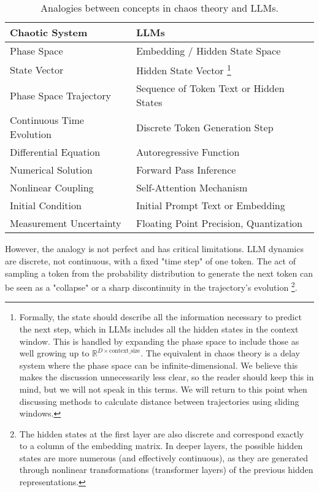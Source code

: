 \documentclass[a4paper,12pt]{article}
\begin{document}
\begin{table}[H]
\centering
\begin{tabular}{@{}ll@{}}
\toprule
\textbf{Chaotic System} & \textbf{LLMs} \\ \midrule
Phase Space & Embedding / Hidden State Space \\
State Vector & Hidden State Vector \footnote{Formally, the state should describe all the information necessary to predict the next step, which in LLMs includes all the hidden states in the context window. This is handled by expanding the phase space to include those as well growing up to $\mathbb{R}^{D \times \text{context\_size}}$. The equivalent in chaos theory is a delay system where the phase space can be infinite-dimensional. We believe this makes the discussion unnecessarily less clear, so the reader should keep this in mind, but we will not speak in this terms. We will return to this point when discussing methods to calculate distance between trajectories using sliding windows.} \\ %
Phase Space Trajectory & Sequence of Token Text or Hidden States \\
Continuous Time Evolution & Discrete Token Generation Step \\
Differential Equation & Autoregressive Function \\
Numerical Solution & Forward Pass Inference \\
Nonlinear Coupling & Self-Attention Mechanism \\
Initial Condition & Initial Prompt Text or Embedding \\
Measurement Uncertainty & Floating Point Precision, Quantization \\ \bottomrule
\end{tabular}
\caption{Analogies between concepts in chaos theory and LLMs.}
\label{tab:analogy}
\end{table}


However, the analogy is not perfect and has critical limitations. LLM dynamics are discrete, not continuous, with a fixed "time step" of one token. The act of sampling a token from the probability distribution to generate the next token can be seen as a "collapse" or a sharp discontinuity in the trajectory's evolution \footnote{The hidden states at the first layer are also discrete and correspond exactly to a column of the embedding matrix. In deeper layers, the possible hidden states are more numerous (and effectively continuous), as they are generated through nonlinear transformations (transformer layers) of the previous hidden representations.}.
\end{document}

